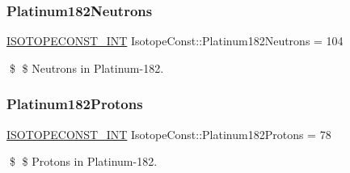 \subsubsection{\texorpdfstring{Platinum182\+Neutrons}{Platinum182Neutrons}}
{\footnotesize\ttfamily \mbox{\hyperlink{group___isotope_const-_macros_ga5f18360b3e99483a35c32d789e62621c}{I\+S\+O\+T\+O\+P\+E\+C\+O\+N\+S\+T\+\_\+\+I\+NT}} Isotope\+Const\+::\+Platinum182\+Neutrons = 104}

\$ \$ Neutrons in Platinum-\/182. \mbox{\label{group___isotope_const-_platinum-_pt182_ga3bfa405b0665ea05d22105826a8b123f}} 
\subsubsection{\texorpdfstring{Platinum182\+Protons}{Platinum182Protons}}
{\footnotesize\ttfamily \mbox{\hyperlink{group___isotope_const-_macros_ga5f18360b3e99483a35c32d789e62621c}{I\+S\+O\+T\+O\+P\+E\+C\+O\+N\+S\+T\+\_\+\+I\+NT}} Isotope\+Const\+::\+Platinum182\+Protons = 78}

\$ \$ Protons in Platinum-\/182. 